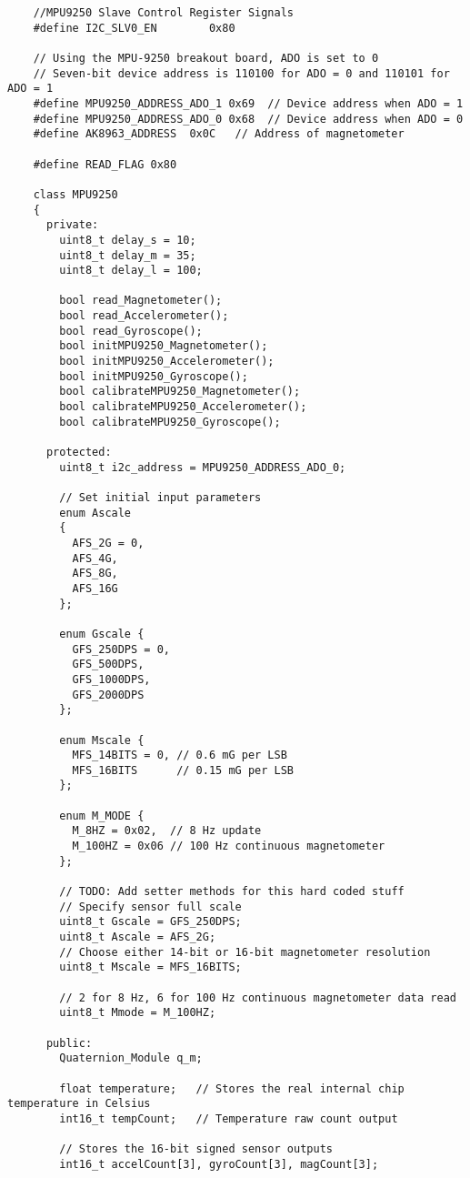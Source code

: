 \begin{lstlisting}
	//MPU9250 Slave Control Register Signals
	#define I2C_SLV0_EN        0x80

	// Using the MPU-9250 breakout board, ADO is set to 0
	// Seven-bit device address is 110100 for ADO = 0 and 110101 for ADO = 1
	#define MPU9250_ADDRESS_ADO_1 0x69  // Device address when ADO = 1
	#define MPU9250_ADDRESS_ADO_0 0x68  // Device address when ADO = 0
	#define AK8963_ADDRESS  0x0C   // Address of magnetometer

	#define READ_FLAG 0x80

	class MPU9250
	{
	  private:
	    uint8_t delay_s = 10;
	    uint8_t delay_m = 35;
	    uint8_t delay_l = 100;

	    bool read_Magnetometer();
	    bool read_Accelerometer();
	    bool read_Gyroscope();
	    bool initMPU9250_Magnetometer();
	    bool initMPU9250_Accelerometer();
	    bool initMPU9250_Gyroscope();
	    bool calibrateMPU9250_Magnetometer();
	    bool calibrateMPU9250_Accelerometer();
	    bool calibrateMPU9250_Gyroscope();

	  protected:
	    uint8_t i2c_address = MPU9250_ADDRESS_ADO_0;

	    // Set initial input parameters
	    enum Ascale
	    {
	      AFS_2G = 0,
	      AFS_4G,
	      AFS_8G,
	      AFS_16G
	    };

	    enum Gscale {
	      GFS_250DPS = 0,
	      GFS_500DPS,
	      GFS_1000DPS,
	      GFS_2000DPS
	    };

	    enum Mscale {
	      MFS_14BITS = 0, // 0.6 mG per LSB
	      MFS_16BITS      // 0.15 mG per LSB
	    };

	    enum M_MODE {
	      M_8HZ = 0x02,  // 8 Hz update
	      M_100HZ = 0x06 // 100 Hz continuous magnetometer
	    };

	    // TODO: Add setter methods for this hard coded stuff
	    // Specify sensor full scale
	    uint8_t Gscale = GFS_250DPS;
	    uint8_t Ascale = AFS_2G;
	    // Choose either 14-bit or 16-bit magnetometer resolution
	    uint8_t Mscale = MFS_16BITS;

	    // 2 for 8 Hz, 6 for 100 Hz continuous magnetometer data read
	    uint8_t Mmode = M_100HZ;

	  public:
	    Quaternion_Module q_m;

	    float temperature;   // Stores the real internal chip temperature in Celsius
	    int16_t tempCount;   // Temperature raw count output

	    // Stores the 16-bit signed sensor outputs
	    int16_t accelCount[3], gyroCount[3], magCount[3];


\end{lstlisting}
